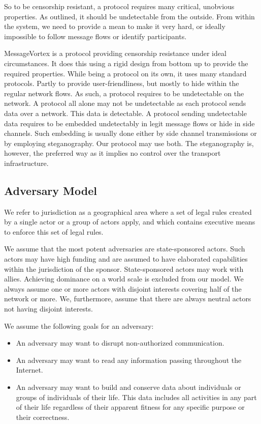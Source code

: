 \documentclass[10pt,journal,compsoc,twocolumn,twoside]{IEEEtran}
\begin{document}
So to be censorship resistant, a protocol requires many critical, unobvious properties. As outlined, it should be undetectable from the outside. From within the system, we need to provide a mean to make it very hard, or ideally impossible to follow message flows or identify participants.

MessageVortex is a protocol providing censorship resistance under ideal circumstances. It does this using a rigid design from bottom up to provide the required properties. While being a protocol on its own, it uses many standard protocols. Partly to provide user-friendliness, but mostly to hide within the regular network flows. As such, a protocol requires to be undetectable on the network. A protocol all alone may not be undetectable as each protocol sends data over a network. This data is detectable. A protocol sending undetectable data requires to be embedded undetectably in legit message flows or hide in side channels. Such embedding is usually done either by side channel transmissions or by employing steganography. Our protocol may use both. The steganography is, however, the preferred way as it implies no control over the transport infrastructure.

\subsection{Adversary Model}
We refer to jurisdiction as a geographical area where a set of legal rules created by a single actor or a group of actors apply, and which contains executive means to enforce this set of legal rules.

We assume that the most potent adversaries are state-sponsored actors. Such actors may have high funding and are assumed to have elaborated capabilities within the jurisdiction of the sponsor. State-sponsored actors may work with allies. Achieving dominance on a world scale is excluded from our model. We always assume one or more actors with disjoint interests covering half of the network or more. We, furthermore, assume that there are always neutral actors not having disjoint interests.

We assume the following goals for an adversary:
\begin{itemize}
	\item An adversary may want to disrupt non-authorized communication.
	\item An adversary may want to read any information passing throughout the Internet.
	\item An adversary may want to build and conserve data about individuals or groups of individuals of their life. This data includes all activities in any part of their life regardless of their apparent fitness for any specific purpose or their correctness.
\end{itemize}
\end{document}
